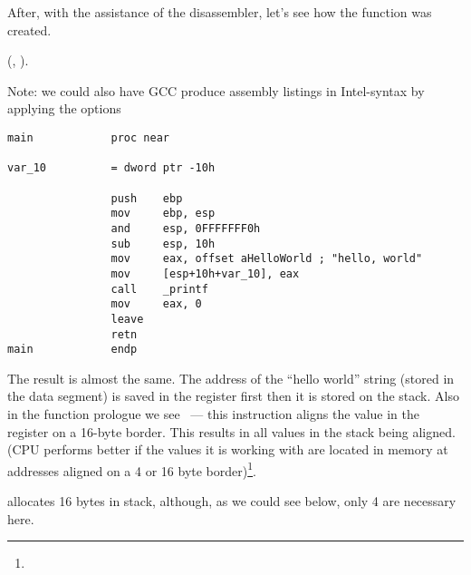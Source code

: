 {After, with the assistance of the \IDA disassembler, let's see how the \main function was created.} 

(\IDA, ).

{Note: we could also have GCC produce assembly listings in Intel-syntax by applying the options} 

\begin{lstlisting}[caption=GCC]
main            proc near

var_10          = dword ptr -10h

                push    ebp
                mov     ebp, esp
                and     esp, 0FFFFFFF0h
                sub     esp, 10h
                mov     eax, offset aHelloWorld ; "hello, world"
                mov     [esp+10h+var_10], eax
                call    _printf
                mov     eax, 0
                leave
                retn
main            endp
\end{lstlisting}

{The result is almost the same.
The address of the ``hello world'' string (stored in the data segment) is saved in the \EAX register first then it is stored on the stack.
Also in the function prologue we see  ~--- 
this instruction aligns the value in the \ESP register on a 16-byte border.
This results in all values in the stack being aligned.
(CPU performs better if the values it is working with are located in memory at addresses aligned 
on a 4 or 16 byte border)\footnote{\URLWPDA}.}

 
{allocates 16 bytes in stack, although, as we could see below, only 4 are necessary here.} 

